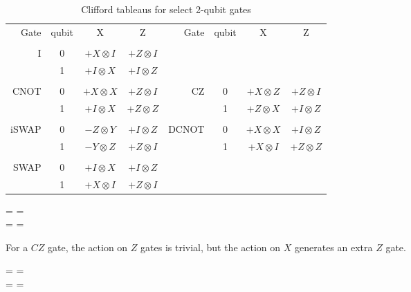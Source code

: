 \begin{table*}[tp]
\caption{Clifford tableaus for select 2-qubit gates}
\label{Fig:CliffordTableaus}
\begin{center}
\begin{tabular}{rcccrccc}
Gate & qubit & X & Z & \hspace{2em} Gate & qubit & X & Z \\
\\
I & 0 & $+ X \otimes I$ & $+ Z \otimes I$ \\
	 & 1 & $+ I \otimes X$ & $+ I \otimes Z$ \\
\\
CNOT & 0 & $+ X \otimes X$ & $+ Z \otimes I$ & CZ   & 0 & $+ X \otimes Z$ & $+ Z \otimes I$ \\
	 & 1 & $+ I \otimes X$ & $+ Z \otimes Z$ &      & 1 & $+ Z \otimes X$ & $+ I \otimes Z$\\
\\
iSWAP & 0 & $- Z \otimes Y$ & $+ I \otimes Z$ & DCNOT & 0 & $+ X \otimes X$ & $+ I \otimes Z$  \\
      & 1 & $- Y \otimes Z$ & $+ Z \otimes I$ &       & 1 & $+ X \otimes I$ & $+ Z \otimes Z$  \\
\\
SWAP & 0 & $+ I \otimes X$ & $+ I \otimes Z$ \\
	 & 1 & $+ X \otimes I$ & $+ Z \otimes I$ \\
\end{tabular}
\end{center}
\end{table*}


\begin{center}
 =  
\hspace{2em}
  =   
\\
 =   
\hspace{2em}
 = 
\end{center}


For a $CZ$ gate, the action on $Z$ gates is trivial, but the action on $X$ generates an extra $Z$ gate.
\begin{center}
 =  
\hspace{2em}
  =   
\\
 =   
\hspace{2em}
 = 
\end{center}

